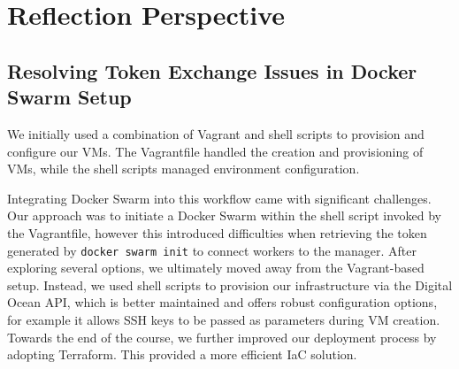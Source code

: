 \section{Reflection Perspective}

\subsection{Resolving Token Exchange Issues in Docker Swarm Setup}

We initially used a combination of Vagrant and shell scripts to provision and configure our VMs. The Vagrantfile handled the creation and provisioning of VMs, while the shell scripts managed environment configuration. 

Integrating Docker Swarm into this workflow came with significant challenges. Our approach was to initiate a Docker Swarm within the shell script invoked by the Vagrantfile, however this introduced difficulties when retrieving the token generated by \texttt{docker swarm init} to connect workers to the manager. 
After exploring several options, we ultimately moved away from the Vagrant-based setup. Instead, we used shell scripts to provision our infrastructure via the Digital Ocean API, which is better maintained and offers robust configuration options, for example it allows SSH keys to be passed as parameters during VM creation. Towards the end of the course, we further improved our deployment process by adopting Terraform. This provided a more efficient IaC solution.

